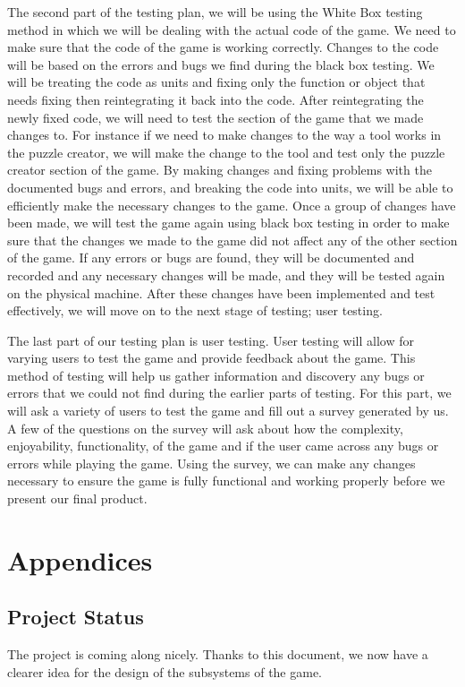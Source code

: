 \documentclass[12pt]{article}
\begin{document}
The second part of the testing plan, we will be using the White Box testing method in which we will be dealing with the actual code of the game. We need to make sure that the code of the game is working correctly.
Changes to the code will be based on the errors and bugs we find during the black box testing. We will be treating the code as units and fixing only the function or object that needs fixing then reintegrating it back into the code. After reintegrating the newly fixed code, we will need to test the section of the game that we made changes to. For instance if we need to make changes to the way a tool works in the puzzle creator, we will make the change to the tool and test only the puzzle creator section of the game.
By making changes and fixing problems with the documented bugs and errors, and breaking the code into units, we will be able to efficiently make the necessary changes to the game. Once a group of changes have been made, we will test the game again using black box testing in order to make sure that the changes we made to the game did not affect any of the other section of the game. If any errors or bugs are found, they will be documented and recorded and any necessary changes will be made, and they will be tested again on the physical machine. After these changes have been implemented and test effectively, we will move on to the next stage of testing; user testing.

The last part of our testing plan is user testing. User testing will allow for varying users to test the game and provide feedback about the game. This method of testing will help us gather information and discovery any bugs or errors that we could not find during the earlier parts of testing. For this part, we will ask a variety of users to test the game and fill out a survey generated by us. A few of the questions on the survey will ask about how the complexity, enjoyability, functionality, of the game and if the user came across any bugs or errors while playing the game. Using the survey, we can make any changes necessary to ensure the game is fully functional and working properly before we present our final product.
\section{Appendices}
\subsection{Project Status}
The project is coming along nicely. Thanks to this document, we now have a clearer idea for the design of the subsystems of the game.
\end{document}
